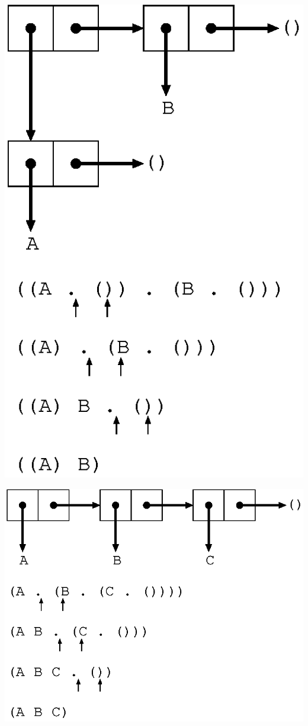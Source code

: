 \documentclass[mingoth,a4paper]{jsarticle}
\begin{document}
\includegraphics[scale=0.5]{image200903/red-pairs.eps}

\includegraphics[scale=0.5]{image200903/red-lpair.eps}
\end{document}
